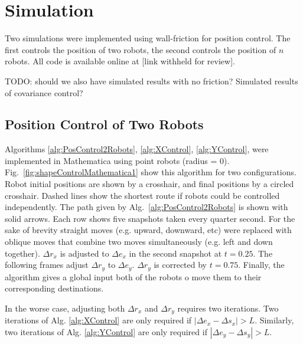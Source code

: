
\section{Simulation}\label{sec:simulation}

Two simulations were implemented using wall-friction for position control.  The first controls the position of two robots, the second controls the position of $n$ robots.  All code is available online at [link withheld for review].

TODO: should we also have simulated results with no friction?  Simulated results of covariance control?


\subsection{Position Control of Two Robots}

Algorithms \ref{alg:PosControl2Robots}, \ref{alg:XControl}, \ref{alg:YControl}, were implemented in Mathematica using point robots (radius = $0$).  Fig.~\ref{fig:shapeControlMathematica1}  show  this algorithm for two configurations. 
Robot initial positions are shown by a crosshair, and final positions by a circled crosshair.  Dashed lines show the shortest route if robots could be controlled independently.  The path given by  Alg.\ \ref{alg:PosControl2Robots} is shown with solid arrows.
Each row shows five snapshots taken every quarter second. For the sake of brevity straight moves (e.g. upward, downward, etc) were replaced with oblique moves that combine two moves simultaneously (e.g. left and down together). 
 $\Delta r_x$ is adjusted to $\Delta e_x$ in the second snapshot at $t = 0.25$. 
 The following frames  adjust $\Delta r_y$ to $\Delta e_y$. 
 $\Delta r_y$ is corrected by $t = 0.75$. 
 Finally, the algorithm gives a global input both of the robots o move them to their corresponding destinations.

In the worse case, adjusting both $\Delta r_x$ and $\Delta r_y$ requires two iterations.   Two iterations of Alg. \ref{alg:XControl} are only required if $|\Delta e_x - \Delta s_x|>L$. 
Similarly,  two iterations of Alg. \ref{alg:YControl} are only required if $|\Delta e_y - \Delta s_y|>L$.








